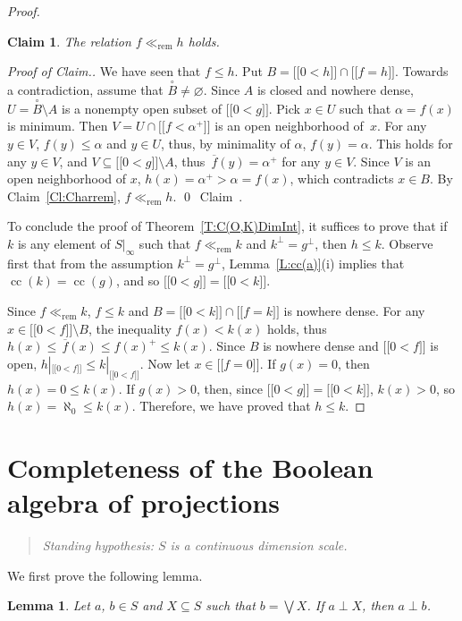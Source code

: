 \documentclass[psamsfonts,reqno]{memo-l}
\theoremstyle{plain}
\newtheorem{lemma}{Lemma}[section]
\newtheorem{claim}{Claim}
\theoremstyle{definition}
\theoremstyle{remark}
\newcommand{\qedc}{{\qed}~{\rm Claim~{\theclaim}.}}
\newenvironment{cproof}
{\begin{proof}[Proof of Claim.]}
{\qedc\renewcommand{\qed}{}\end{proof}}
\numberwithin{equation}{section}
\newcommand{\ol}[1]{\,\overline{\!#1}}
\newcommand{\es}{\varnothing}
\newcommand{\rem}{\ll_{\mathrm{rem}}}
\newcommand{\DI}[1]{#1|_{\infty}}
\newcommand{\vbv}[1]{{[\![}#1{]\!]}}
\DeclareMathOperator{\cc}{cc}
\begin{document}
\begin{proof}
\begin{claim}
The relation $f\rem h$ holds.
\end{claim}

\begin{cproof}
We have seen that $f\leq h$.
Put $B=\vbv{0<h}\cap\vbv{f=h}$. Towards a contradiction, assume that
$\overset{\!\circ}{B}\ne\es$. Since $A$ is closed and nowhere dense,
$U=\overset{\!\circ}{B}\setminus A$ is a nonempty open subset of $\vbv{0<g}$.
Pick $x\in U$ such that
$\alpha=f(x)$ is minimum. Then $V=U\cap\vbv{f<\alpha^+}$
is an open neighborhood of~$x$. For any $y\in V$, $f(y)\leq\alpha$ and
$y\in U$, thus, by minimality of $\alpha$, $f(y)=\alpha$.
This holds for any $y\in V$, and $V\subseteq\vbv{0<g}\setminus A$, thus
$\ol{f}(y)=\alpha^+$ for any $y\in V$. Since $V$ is an open neighborhood of
$x$, $h(x)=\alpha^+>\alpha=f(x)$, which contradicts $x\in B$. By
Claim~\ref{Cl:Charrem}, $f\rem h$.
\end{cproof}

To conclude the proof of Theorem~\ref{T:C(O,K)DimInt}, it suffices to
prove that if $k$ is any element of $\DI{S}$ such that $f\rem k$ and
$k^\bot=g^\bot$, then $h\leq k$. Observe first that from the assumption
$k^\bot=g^\bot$, Lemma~\ref{L:cc(a)}(i) implies that $\cc(k)=\cc(g)$, and so
$\vbv{0<g}=\vbv{0<k}$.

Since $f\rem k$,
$f\leq k$ and $B=\vbv{0<k}\cap\vbv{f=k}$ is nowhere dense.
For any $x\in\vbv{0<f}\setminus B$, the inequality $f(x)<k(x)$ holds, thus
$h(x)\leq\ol{f}(x)\leq f(x)^+\leq k(x)$. Since $B$ is nowhere dense and
$\vbv{0<f}$ is open, $h|_{\vbv{0<f}}\leq k|_{\vbv{0<f}}$. Now let
$x\in\vbv{f=0}$. If $g(x)=0$, then $h(x)=0\leq k(x)$. If $g(x)>0$, then,
since $\vbv{0<g}=\vbv{0<k}$, $k(x)>0$, so $h(x)=\aleph_0\leq k(x)$.
Therefore, we have proved that $h\leq k$.
\end{proof}

\section{Completeness of the Boolean algebra of projections}
\label{S:cBaProj}

\begin{quote}
\em Standing hypothesis: $S$ is a continuous dimension scale.
\end{quote}

We first prove the following lemma.

\begin{lemma}\label{L:OrthCpl}
Let $a$, $b\in S$ and $X\subseteq S$ such that $b=\bigvee X$. If
$a\perp X$, then $a\perp b$.
\end{lemma}
\end{document}
